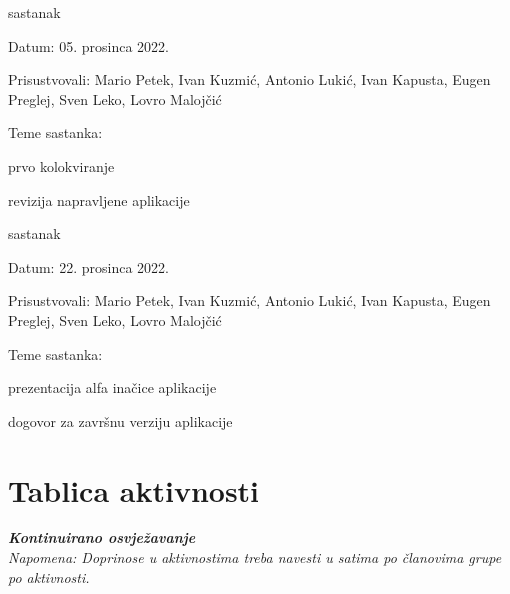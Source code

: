 \begin{packed_enum}
			\item  sastanak
			\item[] \begin{packed_item}
				\item Datum: 05. prosinca 2022.
				\item Prisustvovali: Mario Petek, Ivan Kuzmić, Antonio Lukić, Ivan Kapusta, Eugen Preglej, Sven Leko, Lovro Malojčić
				\item Teme sastanka: 
				\begin{packed_item}
					\item  prvo kolokviranje
					\item  revizija napravljene aplikacije
				\end{packed_item}
			\end{packed_item}
		
			\item  sastanak
			\item[] \begin{packed_item}
				\item Datum: 22. prosinca 2022.
				\item Prisustvovali: Mario Petek, Ivan Kuzmić, Antonio Lukić, Ivan Kapusta, Eugen Preglej, Sven Leko, Lovro Malojčić
				\item Teme sastanka: 
				\begin{packed_item}
					\item  prezentacija alfa inačice aplikacije
					\item  dogovor za završnu verziju aplikacije
				\end{packed_item}
			\end{packed_item}
			
			
		\end{packed_enum}
		
		\eject
		\section*{Tablica aktivnosti}
		
			\textbf{\textit{Kontinuirano osvježavanje}}\\
			
			 \textit{Napomena: Doprinose u aktivnostima treba navesti u satima po članovima grupe po aktivnosti.}

